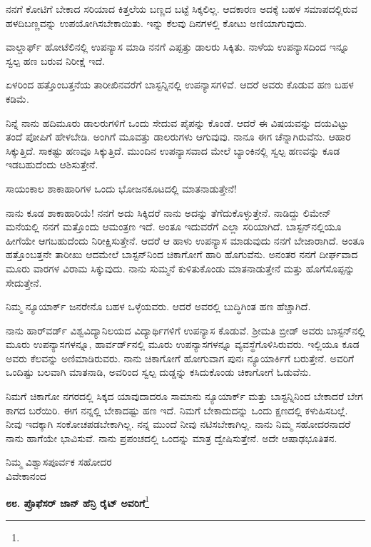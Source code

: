 ನನಗೆ ಕೋಟಿಗೆ ಬೇಕಾದ ಸರಿಯಾದ ಕಿತ್ತಲೆಯ ಬಣ್ಣದ ಬಟ್ಟೆ ಸಿಕ್ಕಲಿಲ್ಲ. ಆದಕಾರಣ ಅದಕ್ಕೆ ಬಹಳ ಸಮಾಪದಲ್ಲಿರುವ ಹಳದಿಬಣ್ಣವನ್ನು ಉಪಯೋಗಿಸಬೇಕಾಯಿತು. ಇನ್ನು ಕೆಲವು ದಿನಗಳಲ್ಲಿ ಕೋಟು ಅಣಿಯಾಗುವುದು.

ವಾಲ್ಡಾರ್ಫ್ ಹೋಟೆಲಿನಲ್ಲಿ ಉಪನ್ಯಾಸ ಮಾಡಿ ನನಗೆ ಎಪ್ಪತ್ತು ಡಾಲರು ಸಿಕ್ಕಿತು. ನಾಳೆಯ ಉಪನ್ಯಾಸದಿಂದ ಇನ್ನೂ ಸ್ವಲ್ಪ ಹಣ ಬರುವ ನಿರೀಕ್ಷೆ ಇದೆ.

ಏಳರಿಂದ ಹತ್ತೊಂಬತ್ತನೆಯ ತಾರೀಖಿನವರೆಗೆ ಬಾಸ್ಟನ್ನಿನಲ್ಲಿ ಉಪನ್ಯಾಸಗಳಿವೆ. ಆದರೆ ಅವರು ಕೊಡುವ ಹಣ ಬಹಳ ಕಡಿಮೆ.

ನಿನ್ನೆ ನಾನು ಹದಿಮೂರು ಡಾಲರುಗಳಿಗೆ ಒಂದು ಸೇದುವ ಪೈಪನ್ನು ಕೊಂಡೆ. ಆದರೆ ಈ ವಿಷಯವನ್ನು ದಯವಿಟ್ಟು ತಂದೆ ಪೋಪಿಗೆ ಹೇಳಬೇಡಿ. ಅಂಗಿಗೆ ಮೂವತ್ತು ಡಾಲರುಗಳು ಆಗುವುವು. ನಾನೂ ಈಗ ಚೆನ್ನಾಗಿರುವೆನು. ಆಹಾರ ಸಿಕ್ಕುತ್ತಿದೆ. ಸಾಕಷ್ಟು ಹಣವೂ ಸಿಕ್ಕುತ್ತಿದೆ. ಮುಂದಿನ ಉಪನ್ಯಾಸವಾದ ಮೇಲೆ ಬ್ಯಾಂಕಿನಲ್ಲಿ ಸ್ವಲ್ಪ ಹಣವನ್ನು ಕೂಡ ಇಡಬಹುದೆಂದು ಆಶಿಸುತ್ತೇನೆ.

ಸಾಯಂಕಾಲ ಶಾಕಾಹಾರಿಗಳ ಒಂದು ಭೋಜನಕೂಟದಲ್ಲಿ ಮಾತನಾಡುತ್ತೇನೆ!

ನಾನು ಕೂಡ ಶಾಕಾಹಾರಿಯೆ! ನನಗೆ ಅದು ಸಿಕ್ಕಿದರೆ ನಾನು ಅದನ್ನು ತೆಗೆದುಕೊಳ್ಳುತ್ತೇನೆ. ನಾಡಿದ್ದು ಲಿಮೇನ್ ಮನೆಯಲ್ಲಿ ನನಗೆ ಮತ್ತೊಂದು ಆಮಂತ್ರಣ ಇದೆ. ಅಂತೂ ಇದುವರೆಗೆ ಎಲ್ಲಾ ಸರಿಯಾಗಿದೆ. ಬಾಸ್ಟನ್‌ನಲ್ಲಿಯೂ ಹೀಗೆಯೇ ಆಗಬಹುದೆಂದು ನಿರೀಕ್ಷಿಸುತ್ತೇನೆ. ಆದರೆ ಆ ಹಾಳು ಉಪನ್ಯಾಸ ಮಾಡುವುದು ನನಗೆ ಬೇಜಾರಾಗಿದೆ. ಅಂತೂ ಹತ್ತೊಂಬತ್ತನೇ ತಾರೀಖು ಆದಮೇಲೆ ಬಾಸ್ಟನ್‌ನಿಂದ ಚಿಕಾಗೋಗೆ ಹಾರಿ ಹೊಗುವೆನು. ಅನಂತರ ನನಗೆ ದೀರ್ಘವಾದ ಮೂರು ವಾರಗಳ ವಿರಾಮ ಸಿಕ್ಕುವುದು. ನಾನು ಸುಮ್ಮನೆ ಕುಳಿತುಕೊಂಡು ಮಾತನಾಡುತ್ತೇನೆ ಮತ್ತು ಹೊಗೆಸೊಪ್ಪನ್ನು ಸೇದುತ್ತೇನೆ.

ನಿಮ್ಮ ನ್ಯೂಯಾರ್ಕ್ ಜನರೇನೊ ಬಹಳ ಒಳ್ಳೆಯವರು. ಆದರೆ ಅವರಲ್ಲಿ ಬುದ್ಧಿಗಿಂತ ಹಣ ಹೆಚ್ಚಾಗಿದೆ.

ನಾನು ಹಾರ್‌ವರ್ಡ್ ವಿಶ್ವವಿದ್ಯಾನಿಲಯದ ವಿದ್ಯಾರ್ಥಿಗಳಿಗೆ ಉಪನ್ಯಾಸ ಕೊಡುವೆ. ಶ‍್ರೀಮತಿ ಬ್ರೀಡ್ ಅವರು ಬಾಸ್ಟನ್‌ನಲ್ಲಿ ಮೂರು ಉಪನ್ಯಾಸಗಳನ್ನೂ, ಹಾರ್ವರ್ಡ್‌ನಲ್ಲಿ ಮೂರು ಉಪನ್ಯಾಸಗಳನ್ನೂ ವ್ಯವಸ್ಥೆಗೊಳಿಸಿರುವರು. ಇಲ್ಲಿಯೂ ಕೂಡ ಅವರು ಕೆಲವನ್ನು ಅಣಿಮಾಡಿರುವರು. ನಾನು ಚಿಕಾಗೋಗೆ ಹೋಗುವಾಗ ಪುನಃ ನ್ಯೂಯಾರ್ಕಿಗೆ ಬರುತ್ತೇನೆ. ಅವರಿಗೆ ಒಂದಿಷ್ಟು ಬಲವಾಗಿ ಮಾತನಾಡಿ, ಅವರಿಂದ ಸ್ವಲ್ಪ ದುಡ್ಡನ್ನು ಕಸಿದುಕೊಂಡು ಚಿಕಾಗೋಗೆ ಓಡುವೆನು.

ನಿಮಗೆ ಚಿಕಾಗೋ ನಗರದಲ್ಲಿ ಸಿಕ್ಕದ ಯಾವುದಾದರೂ ಸಾಮಾನು ನ್ಯೂಯಾರ್ಕ್ ಮತ್ತು ಬಾಸ್ಟನ್ನಿನಿಂದ ಬೇಕಾದರೆ ಬೇಗ ಕಾಗದ ಬರೆಯಿರಿ. ಈಗ ನನ್ನಲ್ಲಿ ಬೇಕಾದಷ್ಟು ಹಣ ಇದೆ. ನಿಮಗೆ ಬೇಕಾದುದನ್ನು ಒಂದು ಕ್ಷಣದಲ್ಲಿ ಕಳುಹಿಸಬಲ್ಲೆ. ನೀವು ಇದಕ್ಕಾಗಿ ಸಂಕೋಚಪಡಬೇಕಾಗಿಲ್ಲ. ನನ್ನ ಮುಂದೆ ನೀವು ನಟಿಸಬೇಕಾಗಿಲ್ಲ. ನಾನು ನಿಮ್ಮ ಸಹೋದರನಾದರೆ ನಾನು ಹಾಗೆಯೇ ಭಾವಿಸುವೆ. ನಾನು ಪ್ರಪಂಚದಲ್ಲಿ ಒಂದನ್ನು ಮಾತ್ರ ದ್ವೇಷಿಸುತ್ತೇನೆ. ಅದೇ ಆಷಾಢಭೂತಿತನ.

{\flushright
ನಿಮ್ಮ ವಿಶ್ವಾಸಪೂರ್ವಕ ಸಹೋದರ\\ವಿವೇಕಾನಂದ\par}

\newpage

\begin{center}
\textbf{೮೮. ಪ್ರೊಫೆಸರ್ ಜಾನ್ ಹೆನ್ರಿ ರೈಟ್ ಅವರಿಗೆ}\footnote{}
\end{center}
\vspace{-0.5cm}

